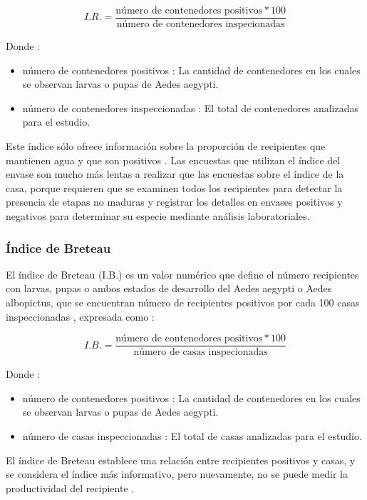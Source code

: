 \begin{equation}
I.R. = \frac{\text{número de contenedores positivos} * 100}{\text{número de contenedores inspecionadas}}
\end{equation}

Donde :
\begin{itemize}
\item número de contenedores positivos : La cantidad de contenedores en los cuales se observan larvas o pupas de Aedes aegypti.
\item número de contenedores  inspeccionadas : El total de contenedores analizadas para el estudio.
\end{itemize}

Este índice sólo ofrece información sobre la proporción de recipientes que mantienen agua y que
son positivos \cite{world2009dengue}. Las encuestas que utilizan el índice del envase son mucho
más lentas a realizar que las encuestas sobre el índice de la casa, porque requieren que se
examinen todos los recipientes para detectar la presencia de etapas no maduras y registrar los
detalles en envases positivos y negativos para determinar su especie mediante análisis
laboratoriales.

\subsubsection{Índice de Breteau}
\cite{ibanez1995vectores} \cite{world2009dengue} \cite{}
El índice de Breteau (I.B.) es un valor numérico que define el número recipientes con larvas,
pupas o ambos estados de desarrollo del Aedes aegypti o Aedes albopictus, que se encuentran número
de recipientes positivos por cada 100 casas inspeccionadas
\cite{ibanez1995vectores, MARQUES1993,world2009dengue}, expresada como :

\begin{equation}
I.B. = \frac{\text{número de contenedores positivos} * 100}{\text{número de casas inspecionadas}}
\end{equation}

Donde :
\begin{itemize}
\item número de contenedores positivos : La cantidad de contenedores en los cuales se observan larvas o pupas de Aedes aegypti.
\item número de casas inspeccionadas : El total de casas analizadas para el estudio.
\end{itemize}

El índice de Breteau establece una relación entre recipientes positivos y casas, y se considera el
índice más informativo, pero nuevamente, no se puede medir la productividad del recipiente
\cite{world2009dengue}.

